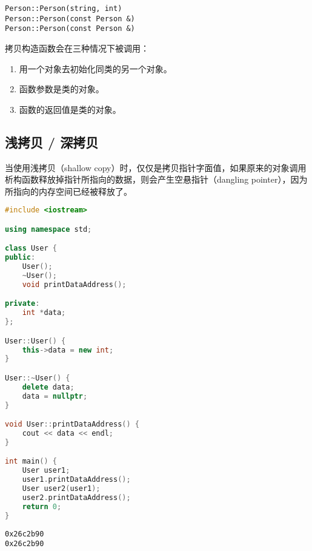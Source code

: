 \begin{tcolorbox}
	\begin{verbatim}
Person::Person(string, int)
Person::Person(const Person &)
Person::Person(const Person &)
	\end{verbatim}
\end{tcolorbox}

拷贝构造函数会在三种情况下被调用：

\begin{enumerate}
	\item 用一个对象去初始化同类的另一个对象。
	\item 函数参数是类的对象。
	\item 函数的返回值是类的对象。
\end{enumerate}

\vspace{0.5cm}

\subsection{浅拷贝 / 深拷贝}

当使用浅拷贝（shallow copy）时，仅仅是拷贝指针字面值，如果原来的对象调用析构函数释放掉指针所指向的数据，则会产生空悬指针（dangling pointer），因为所指向的内存空间已经被释放了。\\


\begin{lstlisting}[language=C++]
#include <iostream>

using namespace std;

class User {
public:
    User();
    ~User();
    void printDataAddress();

private:
    int *data;
};

User::User() {
    this->data = new int;
}

User::~User() {
    delete data;
    data = nullptr;
}

void User::printDataAddress() {
    cout << data << endl;
}

int main() {
    User user1;
    user1.printDataAddress();
    User user2(user1);
    user2.printDataAddress();  
    return 0;
}
\end{lstlisting}

\begin{tcolorbox}
	\begin{verbatim}
0x26c2b90
0x26c2b90
	\end{verbatim}
\end{tcolorbox}

